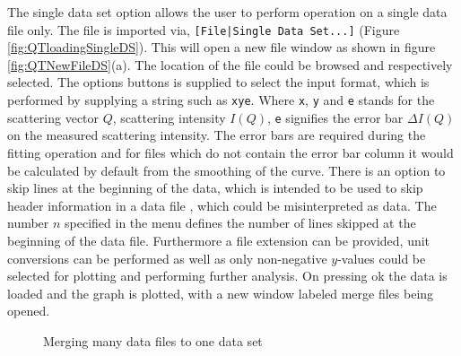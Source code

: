 The single data set option allows the user to perform operation on a
single data file only. The file is imported via,
\verb"[File|Single Data Set...]" (Figure \ref{fig:QTloadingSingleDS}).
This will open a new file window as shown in figure
\ref{fig:QTNewFileDS}(a). The location of the file could be browsed
and respectively selected. The options buttons is supplied to select
the input format, which is performed by supplying a string such as
\texttt{xye}. Where \texttt{x}, \texttt{y} and \texttt{e} stands for
the scattering vector $Q$, scattering intensity $I(Q)$, \texttt{e}
signifies the error bar $\Delta I(Q)$ on the measured scattering intensity.
The error bars are required during the fitting operation and for files
which do not contain the error bar column it would be calculated by
default from the smoothing of the curve. There is an option to skip
lines at the beginning of the data, which is intended to be used to
skip header information in a data file , which could be misinterpreted
as data. The number $n$ specified in the menu defines the number of
lines skipped at the beginning of the data file.
Furthermore a file extension can be provided, unit conversions can be
performed as well as only non-negative $y$-values could be selected
for plotting and performing further analysis. On pressing ok the
data is loaded and the graph is plotted, with a new window labeled
merge files being opened.


\begin{figure}[htb]
\centering
\caption{Merging many data files to one data set} \label{fig:QTmergeSDS}
\end{figure}

